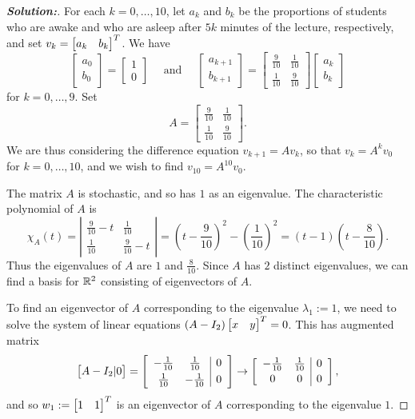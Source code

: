 \documentclass[a4paper]{amsart}
\theoremstyle{definition}
\newenvironment{solution}{\begin{proof}[\textbf{Solution:}] \vphantom{u}}{\end{proof}}
\begin{document}
\begin{solution}
 For each $k = 0, \ldots, 10$, let $a_k$ and $b_k$ be the
 proportions of students who are awake and who are asleep after
 $5k$ minutes of the lecture, respectively, and set $v_k
 = \left[\begin{matrix} a_k & b_k \end{matrix}\right]^T$. We have
     \[
     \left[\begin{array}{cc} a_0\\ b_0 \end{array}\right]
     =\left[\begin{array}{cc} 1\\ 0 \end{array}\right]
    \quad \text{~and~} \quad \left[\begin{array}{cc} a_{k+1}\\ b_{k+1}
    \end{array}\right]=
     \left[\begin{array}{cc} \frac{9}{10} & \frac{1}{10}\\[3pt]
     \frac{1}{10} & \frac{9}{10}
     \end{array}\right] \left[\begin{array}{cc} a_k\\ b_k \end{array}\right]
     \]
 for $k = 0, \ldots, 9$. Set
 \[
    A =
       \left[\begin{array}{cc} \frac{9}{10} & \frac{1}{10}\\[3pt]
     \frac{1}{10} & \frac{9}{10}
     \end{array}\right].
 \]
 We are thus considering the difference equation $v_{k+1} = Av_k$, so
 that $v_k =
 A^kv_0$ for $k = 0, \ldots, 10$, and we wish to find $v_{10} = A^{10}v_0$.

 The matrix $A$ is stochastic, and so has $1$ as an eigenvalue. The characteristic polynomial of $A$ is
 \[
 \chi_A(t) = \left| \begin{array}{cc} \frac{9}{10} - t & \frac{1}{10}\\[3pt] \frac{1}{10}
 & \frac{9}{10} - t \end{array} \right| =
 {\textstyle \left(t - \frac{9}{10}\right)^2 -
 \left(\frac{1}{10}\right)^2 = (t - 1)\left( t - \frac{8}{10}\right)}.
 \]
 Thus the eigenvalues of $A$ are $1$ and $\frac{8}{10}$. Since $A$ has $2$ distinct
 eigenvalues, we can find a basis for ${\mathbb{R}}^2$ consisting of
 eigenvectors of $A$.

 To find an eigenvector of $A$ corresponding to the eigenvalue $\lambda_1 :=1$,
 we need to solve the system of linear equations
 $(A - I_2)\left[\begin{matrix} x & y \end{matrix}\right]^T = 0$. This has augmented matrix
 \[
 \left[\begin{matrix} A - I_2|0 \end{matrix}\right] = \left[\begin{array}{cc|c}
 - \frac{1}{10} & \frac{1}{10} & 0\\[3pt]
 \frac{1}{10}
 &- \frac{1}{10} & 0\end{array} \right] \to
  \left[\begin{array}{cc|c}- \frac{1}{10} & \frac{1}{10} & 0\\[2pt]
 0
 & 0 & 0\end{array} \right],
 \]
 and so $w_1 :=\left[\begin{matrix} 1 & 1\end{matrix}\right]^T$ is an eigenvector of $A$ corresponding to
 the eigenvalue $1$.


\end{solution}
\end{document}
